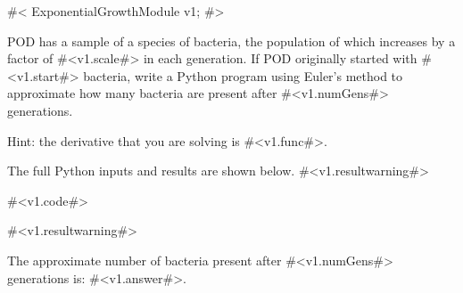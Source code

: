 

#<
ExponentialGrowthModule v1;
#>

POD has a sample of a species of bacteria, the population of which
increases by a factor of #<v1.scale#> in each generation.  If POD
originally started with #<v1.start#> bacteria, write a Python program
using Euler's method to approximate how many bacteria are present
after #<v1.numGens#> generations.

Hint: the derivative that you are solving is #<v1.func#>.


The full Python inputs and results are shown below.  #<v1.resultwarning#>

#<v1.code#>


#<v1.resultwarning#>

The approximate number of bacteria present after #<v1.numGens#>
generations is: #<v1.answer#>.



